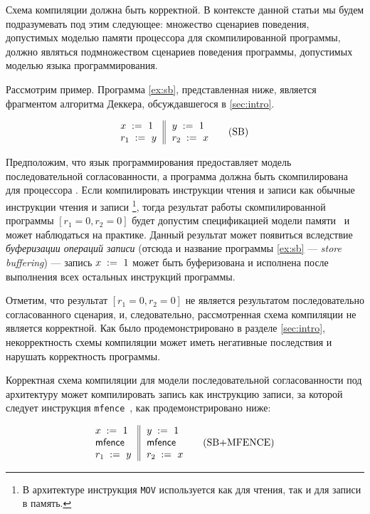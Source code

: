 Схема компиляции должна быть корректной. 
В контексте данной статьи мы будем подразумевать под 
этим следующее: множество сценариев поведения, допустимых
моделью памяти процессора для скомпилированной программы, 
должно являться подмножеством сценариев поведения программы, допустимых 
моделью языка программирования. 

Рассмотрим пример. 
Программа \ref{ex:sb}, представленная ниже, является 
фрагментом алгоритма Деккера, обсуждавшегося  в   \cref{sec:intro}.

\begin{equation*}
\inarrII{
   \writeInst{}{x}{1}   \\
   \readInst{}{r_1}{y}  \\
}{
  \writeInst{}{y}{1}   \\
  \readInst{}{r_2}{x}  \\
}
\tag{SB}\label{ex:sb}
\end{equation*}

Предположим, что язык программирования предоставляет 
модель последовательной согласованности, а программа
должна быть скомпилирована для процессора \Intel. 
Если компилировать инструкции чтения и записи 
как обычные инструкции чтения и записи \Intel \footnote{
В архитектуре \Intel инструкция \texttt{MOV} 
используется как для чтения, так и для записи в память.},
тогда результат работы скомпилированной программы
${[r_1=0, r_2=0]}$ будет допустим спецификацией модели памяти~\Intel
и может наблюдаться на практике. 
Данный результат может появиться вследствие 
\emph{буферизации операций записи}
(отсюда и название программы \ref{ex:sb} --- \emph{store buffering}) ---  
запись ${x\;:=_{}\;1}$ может быть буферизована 
и исполнена после выполнения всех остальных инструкций программы. 

Отметим, что результат ${[r_1=0, r_2=0]}$ не является результатом последовательно согласованного сценария,
и, следовательно, рассмотренная схема компиляции не является корректной. 
Как было продемонстрировано в разделе \cref{sec:intro}, 
некорректность схемы компиляции может иметь 
негативные последствия и нарушать корректность программы. 

Корректная схема компиляции для модели последовательной согласованности 
под архитектуру \Intel может компилировать 
запись как инструкцию записи, за которой следует 
инструкция \texttt{mfence}~\cite{Sewell-al:CACM10, Batty-al:POPL11}, 
как продемонстрировано ниже:

\begin{equation*}
\inarrII{
   \writeInst{}{x}{1}   \\
   \mfenceInst          \\
   \readInst{}{r_1}{y}  \\
}{
  \writeInst{}{y}{1}   \\
  \mfenceInst          \\
  \readInst{}{r_2}{x}  \\
}
\tag{SB+MFENCE}\label{ex:sb-mfence}
\end{equation*}

